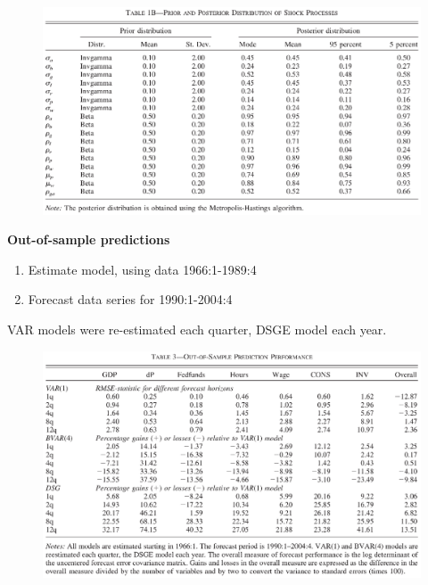 \documentclass{beamer}
\begin{document}
\begin{frame}
  \begin{figure}
    \includegraphics[scale=.7]{sw_table1b.eps}
  \end{figure}
\end{frame}

\begin{frame}
  \textbf{Out-of-sample predictions}
  \begin{enumerate}
    \item Estimate model, using data 1966:1-1989:4
    \item Forecast data series for 1990:1-2004:4
  \end{enumerate}
  \medskip
  VAR models were re-estimated each quarter, DSGE model each year.
\end{frame}

\begin{frame}
  \begin{figure}
    \includegraphics[scale=.7]{sw_table3.eps}
  \end{figure}
\end{frame}
\end{document}
